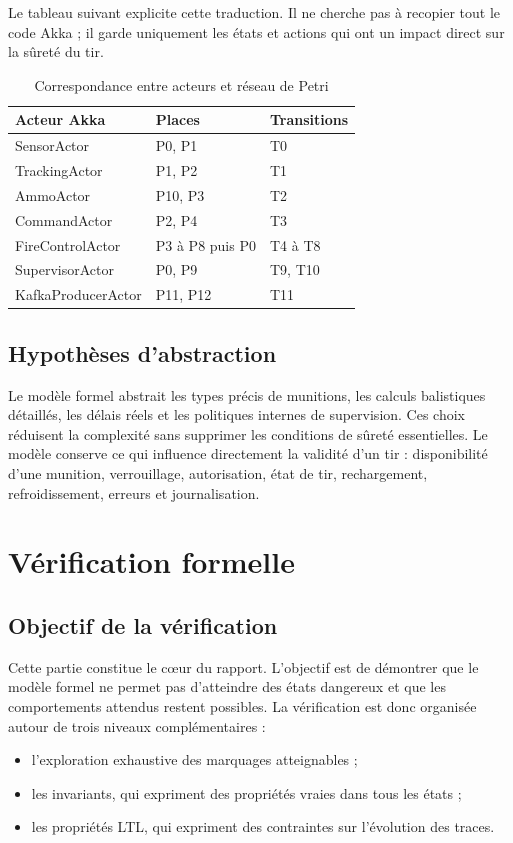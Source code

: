 \documentclass[11pt,a4paper]{report}
\begin{document}
Le tableau suivant explicite cette traduction. Il ne cherche pas à recopier tout le code Akka ; il garde uniquement les états et actions qui ont un impact direct sur la sûreté du tir.

\begin{table}[H]
\centering
\caption{Correspondance entre acteurs et réseau de Petri}
\begin{tabularx}{\textwidth}{lYY}
\toprule
Acteur Akka & Places & Transitions \\
\midrule
SensorActor & P0, P1 & T0 \\
TrackingActor & P1, P2 & T1 \\
AmmoActor & P10, P3 & T2 \\
CommandActor & P2, P4 & T3 \\
FireControlActor & P3 à P8 puis P0 & T4 à T8 \\
SupervisorActor & P0, P9 & T9, T10 \\
KafkaProducerActor & P11, P12 & T11 \\
\bottomrule
\end{tabularx}
\end{table}

\section{Hypothèses d'abstraction}
Le modèle formel abstrait les types précis de munitions, les calculs balistiques détaillés, les délais réels et les politiques internes de supervision. Ces choix réduisent la complexité sans supprimer les conditions de sûreté essentielles. Le modèle conserve ce qui influence directement la validité d'un tir : disponibilité d'une munition, verrouillage, autorisation, état de tir, rechargement, refroidissement, erreurs et journalisation.

\chapter{Vérification formelle}
\label{chap:verification}

\section{Objectif de la vérification}
Cette partie constitue le cœur du rapport. L'objectif est de démontrer que le modèle formel ne permet pas d'atteindre des états dangereux et que les comportements attendus restent possibles. La vérification est donc organisée autour de trois niveaux complémentaires :
\begin{itemize}
  \item l'exploration exhaustive des marquages atteignables ;
  \item les invariants, qui expriment des propriétés vraies dans tous les états ;
  \item les propriétés LTL, qui expriment des contraintes sur l'évolution des traces.
\end{itemize}
\end{document}
